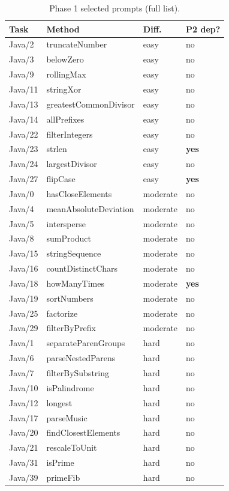 \documentclass[journal]{IEEEtran}
\begin{document}
\begin{table}[!ht]
\renewcommand{\arraystretch}{1.05}
\caption{Phase 1 selected prompts (full list).}
\label{tab:prompts-full}
\centering
\footnotesize
\begin{tabular}{@{}llll@{}}
\toprule
\textbf{Task} & \textbf{Method} & \textbf{Diff.} & \textbf{P2 dep?} \\
\midrule
Java/2  & truncateNumber       & easy  & no \\
Java/3  & belowZero            & easy  & no \\
Java/9  & rollingMax           & easy  & no \\
Java/11 & stringXor            & easy  & no \\
Java/13 & greatestCommonDivisor& easy  & no \\
Java/14 & allPrefixes          & easy  & no \\
Java/22 & filterIntegers       & easy  & no \\
Java/23 & strlen               & easy  & \textbf{yes} \\
Java/24 & largestDivisor       & easy  & no \\
Java/27 & flipCase             & easy  & \textbf{yes} \\
\midrule
Java/0  & hasCloseElements     & moderate & no \\
Java/4  & meanAbsoluteDeviation& moderate & no \\
Java/5  & intersperse          & moderate & no \\
Java/8  & sumProduct           & moderate & no \\
Java/15 & stringSequence       & moderate & no \\
Java/16 & countDistinctChars   & moderate & no \\
Java/18 & howManyTimes         & moderate & \textbf{yes} \\
Java/19 & sortNumbers          & moderate & no \\
Java/25 & factorize            & moderate & no \\
Java/29 & filterByPrefix       & moderate & no \\
\midrule
Java/1  & separateParenGroups  & hard & no \\
Java/6  & parseNestedParens    & hard & no \\
Java/7  & filterBySubstring    & hard & no \\
Java/10 & isPalindrome         & hard & no \\
Java/12 & longest              & hard & no \\
Java/17 & parseMusic           & hard & no \\
Java/20 & findClosestElements  & hard & no \\
Java/21 & rescaleToUnit        & hard & no \\
Java/31 & isPrime              & hard & no \\
Java/39 & primeFib             & hard & no \\
\bottomrule
\end{tabular}
\end{table}
\end{document}
